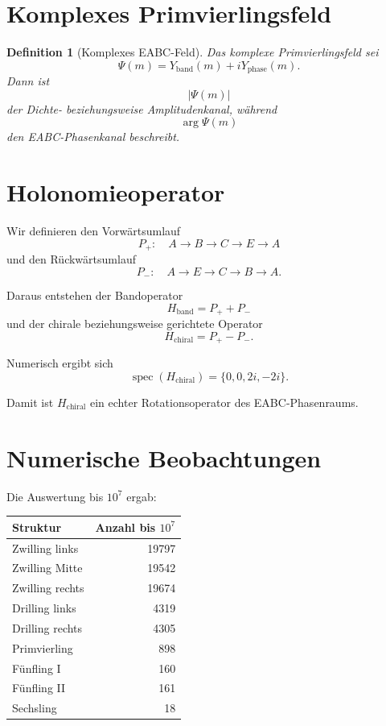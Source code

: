 \documentclass[11pt,a4paper]{article}
\newtheorem{definition}{Definition}
\begin{document}
	\section{Komplexes Primvierlingsfeld}
	
	\begin{definition}[Komplexes EABC-Feld]
		Das komplexe Primvierlingsfeld sei
		\[
		\Psi(m)
		=
		Y_{\mathrm{band}}(m)
		+
		iY_{\mathrm{phase}}(m).
		\]
		Dann ist
		\[
		|\Psi(m)|
		\]
		der Dichte- beziehungsweise Amplitudenkanal, während
		\[
		\arg \Psi(m)
		\]
		den EABC-Phasenkanal beschreibt.
	\end{definition}
	
	\section{Holonomieoperator}
	
	Wir definieren den Vorwärtsumlauf
	\[
	P_+:\quad A\to B\to C\to E\to A
	\]
	und den Rückwärtsumlauf
	\[
	P_-:\quad A\to E\to C\to B\to A.
	\]
	
	Daraus entstehen der Bandoperator
	\[
	H_{\mathrm{band}}=P_+ + P_-
	\]
	und der chirale beziehungsweise gerichtete Operator
	\[
	H_{\mathrm{chiral}}=P_+ - P_-.
	\]
	
	Numerisch ergibt sich
	\[
	\operatorname{spec}(H_{\mathrm{chiral}})
	=
	\{0,0,2i,-2i\}.
	\]
	
	Damit ist \(H_{\mathrm{chiral}}\) ein echter Rotationsoperator des EABC-Phasenraums.
	
	\section{Numerische Beobachtungen}
	
	Die Auswertung bis \(10^7\) ergab:
	
	\begin{center}
		\begin{tabular}{l r}
			\toprule
			Struktur & Anzahl bis \(10^7\) \\
			\midrule
			Zwilling links & 19797 \\
			Zwilling Mitte & 19542 \\
			Zwilling rechts & 19674 \\
			Drilling links & 4319 \\
			Drilling rechts & 4305 \\
			Primvierling & 898 \\
			Fünfling I & 160 \\
			Fünfling II & 161 \\
			Sechsling & 18 \\
			\bottomrule
		\end{tabular}
	\end{center}
	
\end{document}
